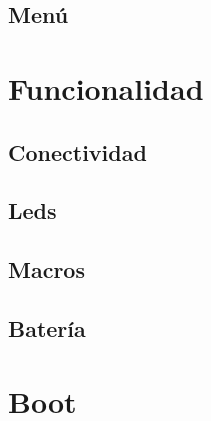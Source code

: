 \subsection{Menú}

\section{Funcionalidad}
\subsection{Conectividad}
\subsection{Leds}
\subsection{Macros}
\subsection{Batería}

\section{Boot}